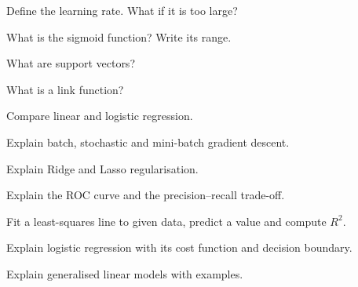 \begin{iq}
\item \twom Define the learning rate. What if it is too large?
\item \twom What is the sigmoid function? Write its range.
\item \twom What are support vectors?
\item \twom What is a link function?
\item \fivem Compare linear and logistic regression.
\item \fivem Explain batch, stochastic and mini-batch gradient descent.
\item \fivem Explain Ridge and Lasso regularisation.
\item \fivem Explain the ROC curve and the precision--recall trade-off.
\item \tenm Fit a least-squares line to given data, predict a value and compute $R^2$.
\item \tenm Explain logistic regression with its cost function and decision boundary.
\item \tenm Explain generalised linear models with examples.
\end{iq}
